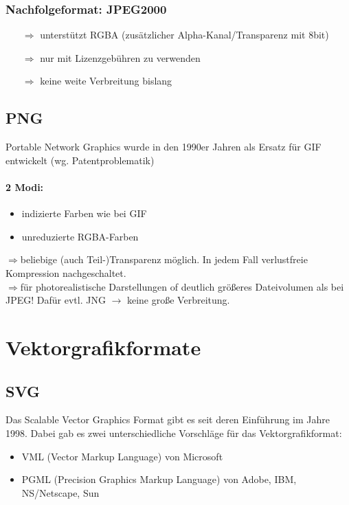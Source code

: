 \subsubsection{Nachfolgeformat: JPEG2000}
\begin{itemize}
\item[$\Rightarrow$] unterstützt RGBA (zusätzlicher Alpha-Kanal/Transparenz mit 8bit)
\item[$\Rightarrow$] nur mit Lizenzgebühren zu verwenden
\item[$\Rightarrow$] keine weite Verbreitung bislang
\end{itemize}

\newpage

\subsection{PNG}
Portable Network Graphics wurde in den 1990er Jahren als Ersatz für GIF entwickelt (wg. Patentproblematik)
\paragraph{2 Modi:} \begin{itemize} \item indizierte Farben wie bei GIF
\item unreduzierte RGBA-Farben\end{itemize}
$\Rightarrow$beliebige (auch Teil-)Transparenz möglich. In jedem Fall verlustfreie Kompression nachgeschaltet.\\
$\Rightarrow$für photorealistische Darstellungen of deutlich größeres Dateivolumen als bei JPEG! Dafür evtl. JNG $\rightarrow$ keine große Verbreitung.

\section{Vektorgrafikformate}
\subsection{SVG}
Das Scalable Vector Graphics Format gibt es seit deren Einführung im Jahre 1998. Dabei gab es zwei unterschiedliche Vorschläge für das Vektorgrafikformat:
\begin{itemize}
\item VML (Vector Markup Language) von Microsoft
\item PGML (Precision Graphics Markup Language) von Adobe, IBM, NS/Netscape, Sun
\end{itemize}

